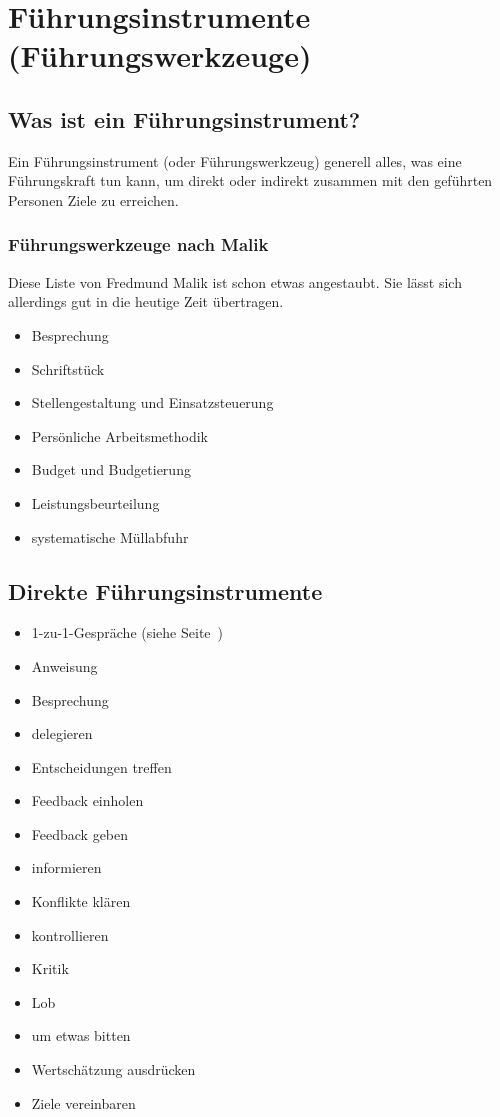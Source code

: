 \section{Führungsinstrumente (Führungswerkzeuge)}
\label{fuehrungsinstrumente}

\subsection{Was ist ein Führungsinstrument?}

Ein Führungsinstrument (oder Führungswerkzeug) generell alles, was eine Führungskraft tun kann, um direkt oder indirekt zusammen mit den geführten Personen Ziele zu erreichen.

\subsubsection{Führungswerkzeuge nach Malik}

Diese Liste von Fredmund Malik \cite{malik-fuehrung} ist schon etwas angestaubt. Sie lässt sich allerdings gut in die heutige Zeit übertragen.

\begin{itemize}
    \item Besprechung
    \item Schriftstück
    \item Stellengestaltung und Einsatzsteuerung
    \item Persönliche Arbeitsmethodik
    \item Budget und Budgetierung
    \item Leistungsbeurteilung
    \item systematische Müllabfuhr
\end{itemize}

\subsection{Direkte Führungsinstrumente}

\begin{itemize}
    \item 1-zu-1-Gespräche (siehe Seite~\pageref{1-zu-1})
    \item Anweisung
    \item Besprechung
    \item delegieren
    \item Entscheidungen treffen
    \item Feedback einholen
    \item Feedback geben
    \item informieren
    \item Konflikte klären
    \item kontrollieren
    \item Kritik
    \item Lob
    \item um etwas bitten
    \item Wertschätzung ausdrücken
    \item Ziele vereinbaren
\end{itemize}

